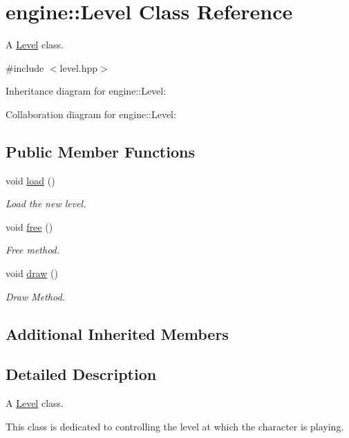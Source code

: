 \hypertarget{classengine_1_1_level}{}\section{engine\+:\+:Level Class Reference}
\label{classengine_1_1_level}


A \hyperlink{classengine_1_1_level}{Level} class.  




{\ttfamily \#include $<$level.\+hpp$>$}



Inheritance diagram for engine\+:\+:Level\+:


Collaboration diagram for engine\+:\+:Level\+:
\subsection*{Public Member Functions}
\begin{DoxyCompactItemize}
\item 
void \hyperlink{classengine_1_1_level_ab213ddeeb92129f90837246605430254}{load} ()
\begin{DoxyCompactList}\small\item\em Load the new level. \end{DoxyCompactList}\item 
void \hyperlink{classengine_1_1_level_abb665514c17a427c4664dbc6bd1e488b}{free} ()
\begin{DoxyCompactList}\small\item\em Free method. \end{DoxyCompactList}\item 
void \hyperlink{classengine_1_1_level_a9b7478818e1aa80d3d4d059fa5faf9bf}{draw} ()
\begin{DoxyCompactList}\small\item\em Draw Method. \end{DoxyCompactList}\end{DoxyCompactItemize}
\subsection*{Additional Inherited Members}


\subsection{Detailed Description}
A \hyperlink{classengine_1_1_level}{Level} class. 

This class is dedicated to controlling the level at which the character is playing. 

